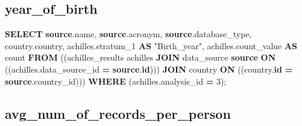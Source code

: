 \documentclass[
]{book}
\newenvironment{Shaded}{\begin{snugshade}}{\end{snugshade}}
\newcommand{\DecValTok}[1]{\textcolor[rgb]{0.00,0.00,0.81}{#1}}
\newcommand{\FunctionTok}[1]{\textcolor[rgb]{0.00,0.00,0.00}{#1}}
\newcommand{\KeywordTok}[1]{\textcolor[rgb]{0.13,0.29,0.53}{\textbf{#1}}}
\newcommand{\NormalTok}[1]{#1}
\newcommand{\OperatorTok}[1]{\textcolor[rgb]{0.81,0.36,0.00}{\textbf{#1}}}
\newcommand{\OtherTok}[1]{\textcolor[rgb]{0.56,0.35,0.01}{#1}}
\begin{document}
\hypertarget{year_of_birth}{%
\subsection*{year\_of\_birth}\label{year_of_birth}}

\begin{Shaded}
\begin{Highlighting}[]
\KeywordTok{SELECT} \KeywordTok{source}\NormalTok{.name,}
   \KeywordTok{source}\NormalTok{.acronym,}
   \KeywordTok{source}\NormalTok{.database\_type,}
\NormalTok{   country.country,}
\NormalTok{   achilles.stratum\_1 }\KeywordTok{AS} \OtherTok{"Birth\_year"}\NormalTok{,}
\NormalTok{   achilles.count\_value }\KeywordTok{AS} \FunctionTok{count}
  \KeywordTok{FROM}\NormalTok{ ((achilles\_results achilles}
    \KeywordTok{JOIN}\NormalTok{ data\_source }\KeywordTok{source}
      \KeywordTok{ON}\NormalTok{ ((achilles.data\_source\_id }\OperatorTok{=} \KeywordTok{source}\NormalTok{.}\KeywordTok{id}\NormalTok{)))}
    \KeywordTok{JOIN}\NormalTok{ country }\KeywordTok{ON}\NormalTok{ ((country.}\KeywordTok{id} \OperatorTok{=} \KeywordTok{source}\NormalTok{.country\_id)))}
 \KeywordTok{WHERE}\NormalTok{ (achilles.analysis\_id }\OperatorTok{=} \DecValTok{3}\NormalTok{);}
\end{Highlighting}
\end{Shaded}

\hypertarget{avg_num_of_records_per_person}{%
\subsection*{avg\_num\_of\_records\_per\_person}\label{avg_num_of_records_per_person}}
\end{document}
